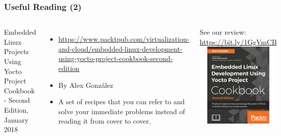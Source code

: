 \begin{frame}
  \frametitle{Useful Reading (2)}
  \begin{columns}
    Embedded Linux Projects Using Yocto Project Cookbook - Second Edition, January 2018
    \begin{itemize}
    \item \url{https://www.packtpub.com/virtualization-and-cloud/embedded-linux-development-using-yocto-project-cookbook-second-edition}
    \item By Alex González
    \item A set of recipes that you can refer to and solve your
          immediate problems instead of reading it from cover to cover. 
    \end{itemize}
    See our review: \url{https://bit.ly/1GgVmCB}
    \includegraphics[width=\textwidth]{slides/yocto-resources/ELPYPC.jpg}
  \end{columns}
\end{frame}
